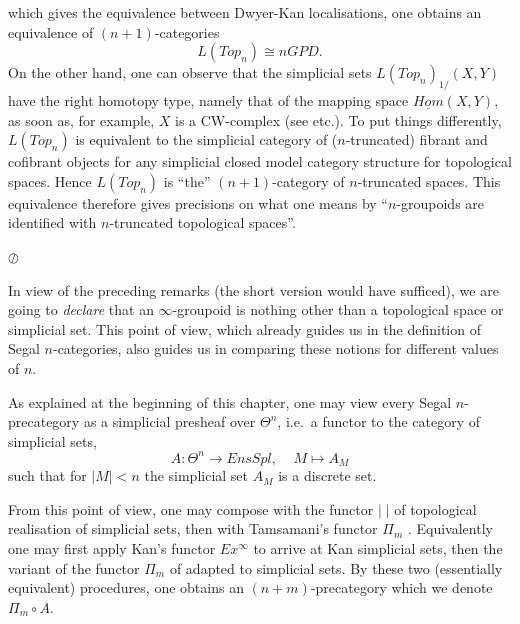 which gives the equivalence between Dwyer-Kan localisations,
one obtains an equivalence of $(n+1)$-categories
$$
L(Top_n)\cong nGPD.
$$
On the other hand, one can observe that the
simplicial sets
$L(Top _n)_{1/}(X,Y)$ have the right homotopy type, namely that
of the mapping space
$\underline{Hom}(X,Y)$, as soon as, for example, $X$ is a CW-complex
(see \cite{DwyerKan3} etc.).
To put
things differently, $L(Top_n)$ is equivalent to the simplicial category
of
($n$-truncated) fibrant and cofibrant objects for any simplicial closed model
category structure for topological spaces. Hence
$L(Top_n)$ is ``the'' $(n+1)$-category of $n$-truncated spaces. This
equivalence therefore gives precisions on what one means by
``$n$-groupoids are identified with $n$-truncated topological spaces''.

\noindent $\oslash$

\medskip

In view of the preceding remarks (the short version would have sufficed), we
are going to
{\em declare} that an $\infty$-groupoid is nothing other than a topological
space or simplicial set. This point of view, which already guides us
in the
definition of Segal $n$-categories, also guides us in
comparing these notions for different values of $n$.


As explained at the beginning of this chapter, one may view every Segal
$n$-precategory as a simplicial presheaf over $\Theta ^n$, i.e.\ a
functor to the category of simplicial sets,
$$
A:\Theta ^n \rightarrow EnsSpl,\;\;\;\; M\mapsto A_M
$$
such that for $|M| < n$ the simplicial set
$A_M$ is a discrete set.

From this point of view, one may
compose with the functor
$| \; |$ of topological realisation of simplicial sets, then with
Tamsamani's functor $\Pi _m$ \cite{Tamsamani}. Equivalently
one may first apply Kan's functor
$Ex^{\infty}$ to arrive at Kan simplicial sets, then the variant
of the functor $\Pi _m$ of \cite{Tamsamani} adapted to simplicial
sets.  By these two (essentially equivalent) procedures, one obtains an
$(n+m)$-precategory which we denote  $\Pi _m \circ A$.

